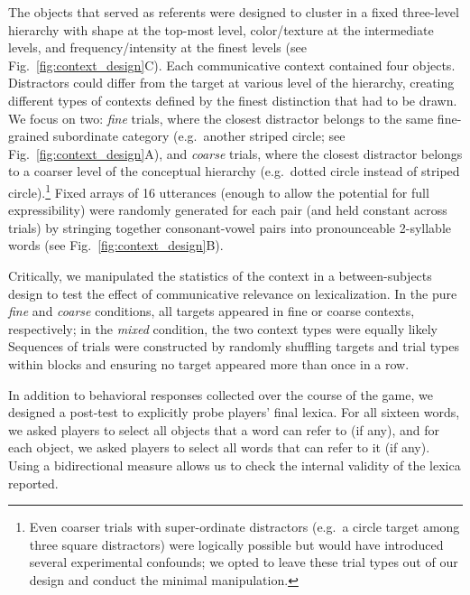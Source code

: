The objects that served as referents were designed to cluster in a fixed three-level hierarchy with shape at the top-most level, color/texture at the intermediate levels, and frequency/intensity at the finest levels (see Fig.\ \ref{fig:context_design}C). Each communicative context contained four objects. Distractors could differ from the target at various level of the hierarchy, creating different types of contexts defined by the finest distinction that had to be drawn. We focus on two: \emph{fine} trials, where the closest distractor belongs to the same fine-grained subordinate category (e.g.\ another striped circle; see Fig.\ \ref{fig:context_design}A), and \emph{coarse} trials, where the closest distractor belongs to a coarser level of the conceptual hierarchy (e.g.\ dotted circle instead of striped circle).\footnote{Even coarser trials with super-ordinate distractors (e.g.\ a circle target among three square distractors) were logically possible but would have introduced several experimental confounds; we opted to leave these trial types out of our design and conduct the minimal manipulation.} Fixed arrays of 16 utterances (enough to allow the potential for full expressibility) were randomly generated for each pair (and held constant across trials) by stringing together consonant-vowel pairs into pronounceable 2-syllable words (see Fig.\ \ref{fig:context_design}B).

Critically, we manipulated the statistics of the context in a between-subjects design to test the effect of communicative relevance on lexicalization. In the pure \emph{fine} and \emph{coarse} conditions, all targets appeared in fine or coarse contexts, respectively; in the \emph{mixed} condition, the two context types were equally likely%
Sequences of trials were constructed by randomly shuffling targets and trial types within blocks and ensuring no target appeared more than once in a row. 

In addition to behavioral responses collected over the course of the game, we designed a post-test to explicitly probe players' final lexica. For all sixteen words, we asked players to select all objects that a word can refer to (if any), and for each object, we asked players to select all words that can refer to it (if any). Using a bidirectional measure allows us to check the internal validity of the lexica reported.%

